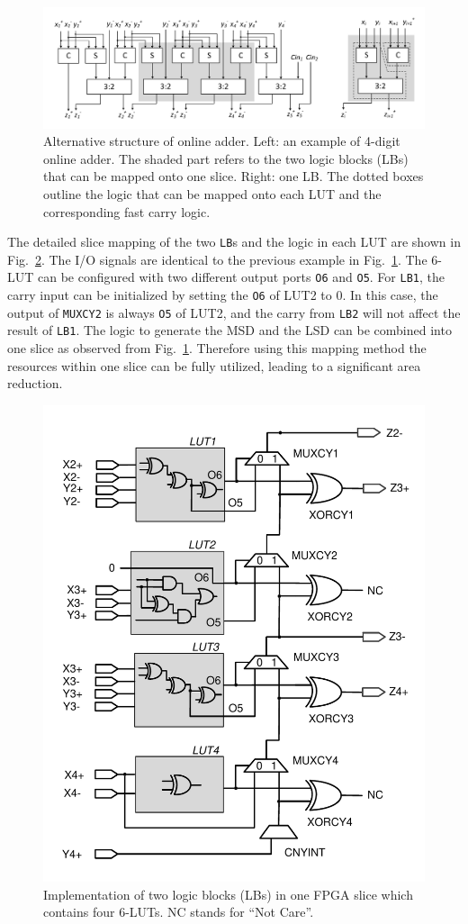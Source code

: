 \documentclass[conference]{IEEEtran}
\begin{document}

\begin{figure}[tbp]
	\centering
	\includegraphics[width=.85\textwidth]{./Figures/SDadder_FPGA_New_4digit2.pdf}
	\vspace{-2ex}
	\caption{Alternative structure of online adder. Left: an example of 4-digit online adder. The shaded part refers to the two logic blocks (LBs) that can be mapped onto one slice. Right: one LB. The dotted boxes outline the logic that can be mapped onto each LUT and the corresponding fast carry logic.}
	\vspace{-2ex}	
	\label{Fig:ModifiedOA}
\end{figure}

The detailed slice mapping of the two \texttt{LB}s and the logic in each LUT are shown in Fig.~\ref{Fig:SliceNew}. The I/O signals are identical to the previous example in Fig.~\ref{Fig:ModifiedOA}. The 6-LUT can be configured with two different output ports \texttt{O6} and \texttt{O5}. For \texttt{LB1}, the carry input can be initialized by setting the \texttt{O6} of LUT2 to 0. In this case, the output of \texttt{MUXCY2} is always \texttt{O5} of LUT2, and the carry from \texttt{LB2} will not affect the result of \texttt{LB1}. The logic to generate the MSD and the LSD can be combined into one slice as observed from Fig.~\ref{Fig:ModifiedOA}. Therefore using this mapping method the resources within one slice can be fully utilized, leading to a significant area reduction.

\begin{figure}[tbp]
	\centering
	\includegraphics[width=.49\textwidth]{./Figures/SDadder_FastCarry_New2.pdf}
	\vspace{-5ex}
	\caption{Implementation of two logic blocks (LBs) in one FPGA slice which contains four 6-LUTs. NC stands for ``Not Care''.}
	\vspace{-2ex}	
	\label{Fig:SliceNew}
\end{figure}
\end{document}
